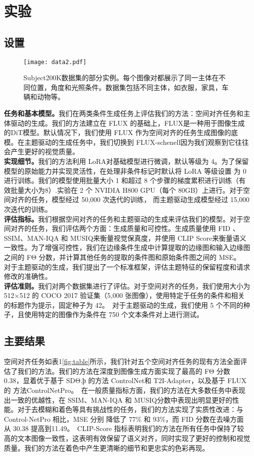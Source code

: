 \section{实验}
\subsection{设置}
\begin{figure}[htbp]
    \centering
    \texttt{[image: data2.pdf]}
    \caption{Subject200K数据集的部分实例。每个图像对都展示了同一主体在不同位置，角度和光照条件。数据集包括不同主体，如衣服，家具，车辆和动物等。}
    \label{fig5}
\end{figure}
\textbf{任务和基本模型。}我们在两类条件生成任务上评估我们的方法：空间对齐任务和主体驱动的生成。我们的方法建立在 FLUX 的基础上，FLUX是一种用于图像生成的DiT模型。默认情况下，我们使用 FLUX 作为空间对齐的任务生成图像的底模。在主题驱动的生成任务中，我们切换到 FLUX-schenell因为我们观察到它往往会产生更好的视觉质量。\\
\textbf{实现细节。}我们的方法利用 LoRA对基础模型进行微调，默认等级为 4。为了保留模型的原始能力并实现灵活性，在处理非条件标记时默认将 LoRA 等级设置 为 0 进行训练。我们的模型使用批量大小 1 和超过 8 个步骤的梯度累积进行训练（有效批量大小为8）.实验在 2 个 NVIDIA H800 GPU（每个 80GB）上进行。对于空间对齐的任务，模型经过 50,000 次迭代的训练， 而主题驱动生成模型经过 15,000 次迭代的训练。\\

\textbf{评估指标。}我们根据空间对齐的任务和主题驱动的生成来评估我们的模型。对于空间对齐的任务，我们评估两个方面：生成质量和可控性。生成质量使用 FID 、SSIM、MAN-IQA 和 MUSIQ来衡量视觉保真度，并使用 CLIP Score\cite{radford2021learning}来衡量语义一致性。为了增强可控性，我们在边缘条件生成中计算提取的边缘图和输入边缘图之间的 FΘ 分数，并计算其他任务的提取的条件图和原始条件图之间的 MSE。\\
对于主题驱动的生成，我们提出了一个标准框架，评估主题特征的保留程度和请求修改的准确性。\\

\textbf{评估准则。}我们对两个数据集进行了评估。对于空间对齐的任务，我们使用大小为 512×512 的 COCO 2017 验证集（5,000 张图像），使用特定于任务的条件和相关的标题作为提示，固定种子为 42。\
对于主题驱动的生成，我们使用 5 个不同的种子，且使用特定的图像作为条件在 750 个文本条件对上进行测试。

\subsection{主要结果}
空间对齐任务如表1\ref{fig:table}所示，我们针对五个空间对齐任务的现有方法全面评估了我们的方法。我们的方法在深度到图像生成方面实现了最高的 FΘ 分数 0.38，显着优于基于 SDΘ.ϸ 的方法 ControlNet和 T2I-Adapter，以及基于 FLUX的 方法ControlNetPro。\
在一般质量指标方面，我们的方法在大多数任务中表现出一致的优越性，在 SSIM\cite{wang2004image}、MAN-IQA\cite{yang2022maniqa} 和 MUSIQ\cite{ke2021musiq}分数中表现出明显更好的性能。对于去模糊和着色等具有挑战性的任务，我们的方法实现了实质性改进：与 Control-NetPro 相比，MSE 分别 降低了 77\% 和 93\%，而 FID 分数在去噪方面从 30.38 提高到11.49。\
CLIP-Score 指标表明我们的方法在所有任务中保持了较高的文本图像一致性，这表明有效保留了语义对齐，同时实现了更好的控制和视觉质量。我们的方法在着色中产生更清晰的细节和更忠实的色彩再现。
